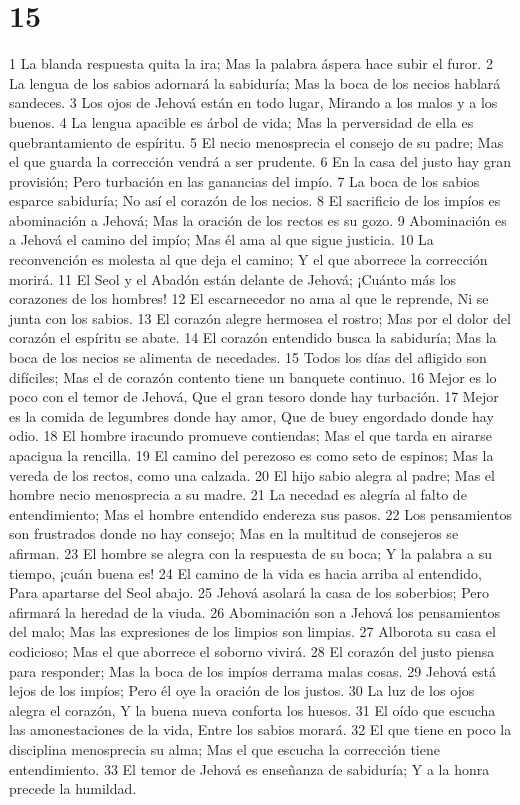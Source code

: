 \chapter{15}

1 La blanda respuesta quita la ira;
Mas la palabra áspera hace subir el furor.
2 La lengua de los sabios adornará la sabiduría;
Mas la boca de los necios hablará sandeces.
3 Los ojos de Jehová están en todo lugar,
Mirando a los malos y a los buenos.
4 La lengua apacible es árbol de vida;
Mas la perversidad de ella es quebrantamiento de espíritu.
5 El necio menosprecia el consejo de su padre;
Mas el que guarda la corrección vendrá a ser prudente.
6 En la casa del justo hay gran provisión;
Pero turbación en las ganancias del impío.
7 La boca de los sabios esparce sabiduría;
No así el corazón de los necios.
8 El sacrificio de los impíos es abominación a Jehová;
Mas la oración de los rectos es su gozo.
9 Abominación es a Jehová el camino del impío;
Mas él ama al que sigue justicia.
10 La reconvención es molesta al que deja el camino;
Y el que aborrece la corrección morirá.
11 El Seol y el Abadón están delante de Jehová;
¡Cuánto más los corazones de los hombres!
12 El escarnecedor no ama al que le reprende,
Ni se junta con los sabios.
13 El corazón alegre hermosea el rostro;
Mas por el dolor del corazón el espíritu se abate.
14 El corazón entendido busca la sabiduría;
Mas la boca de los necios se alimenta de necedades.
15 Todos los días del afligido son difíciles;
Mas el de corazón contento tiene un banquete continuo.
16 Mejor es lo poco con el temor de Jehová,
Que el gran tesoro donde hay turbación.
17 Mejor es la comida de legumbres donde hay amor,
Que de buey engordado donde hay odio.
18 El hombre iracundo promueve contiendas;
Mas el que tarda en airarse apacigua la rencilla.
19 El camino del perezoso es como seto de espinos;
Mas la vereda de los rectos, como una calzada.
20 El hijo sabio alegra al padre;
Mas el hombre necio menosprecia a su madre.
21 La necedad es alegría al falto de entendimiento;
Mas el hombre entendido endereza sus pasos.
22 Los pensamientos son frustrados donde no hay consejo;
Mas en la multitud de consejeros se afirman.
23 El hombre se alegra con la respuesta de su boca;
Y la palabra a su tiempo, ¡cuán buena es!
24 El camino de la vida es hacia arriba al entendido,
Para apartarse del Seol abajo.
25 Jehová asolará la casa de los soberbios;
Pero afirmará la heredad de la viuda.
26 Abominación son a Jehová los pensamientos del malo;
Mas las expresiones de los limpios son limpias.
27 Alborota su casa el codicioso;
Mas el que aborrece el soborno vivirá.
28 El corazón del justo piensa para responder;
Mas la boca de los impíos derrama malas cosas.
29 Jehová está lejos de los impíos;
Pero él oye la oración de los justos.
30 La luz de los ojos alegra el corazón,
Y la buena nueva conforta los huesos.
31 El oído que escucha las amonestaciones de la vida,
Entre los sabios morará.
32 El que tiene en poco la disciplina menosprecia su alma;
Mas el que escucha la corrección tiene entendimiento.
33 El temor de Jehová es enseñanza de sabiduría;
Y a la honra precede la humildad.

